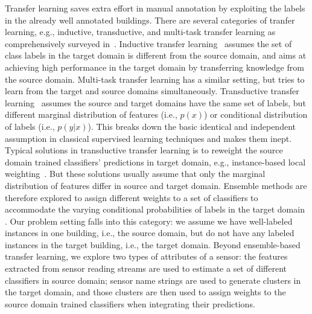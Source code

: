 Transfer learning saves extra effort in manual annotation by exploiting the labels in the already well annotated buildings.
There are several categories of tranfer learning, e.g., inductive, transductive, and multi-task transfer learning as comprehensively surveyed in~\cite{transfer1}.
Inductive transfer learning~\cite{transfer2} assumes the set of class labels in the target domain is different from the source domain, and aims at achieving high performance in the target domain by transferring knowledge from the source domain. Multi-task transfer learning \cite{multitask} has a similar setting, but tries to learn from the target and source domains simultaneously. Transductive transfer learning~\cite{transfer3} assumes the source and target domains have the same set of labels, but different marginal distribution of features (i.e., $p(x)$) or conditional distribution of labels (i.e., $p(y|x)$). This breaks down the basic identical and independent assumption in classical supervised learning techniques and makes them inept. Typical solutions in transductive transfer learning is to reweight the source domain trained classifiers' predictions in target domain, e.g., instance-based local weighting~\cite{weight1,weight2,weight3}. But these solutions usually assume that only the marginal distribution of features differ in source and target domain. Ensemble methods are therefore explored to assign different weights to a set of classifiers to accommodate the varying conditional probabilities of labels in the target domain \cite{ensem1,ensem2}. Our problem setting falls into this category: we assume we have well-labeled instances in one building, i.e., the source domain, but do not have any labeled instances in the target building, i.e., the target domain. Beyond ensemble-based transfer learning, we explore two types of attributes of a sensor: the features extracted from sensor reading streams are used to estimate a set of different classifiers in source domain; sensor name strings are used to generate clusters in the target domain, and those clusters are then used to assign weights to the source domain trained classifiers when integrating their predictions.



